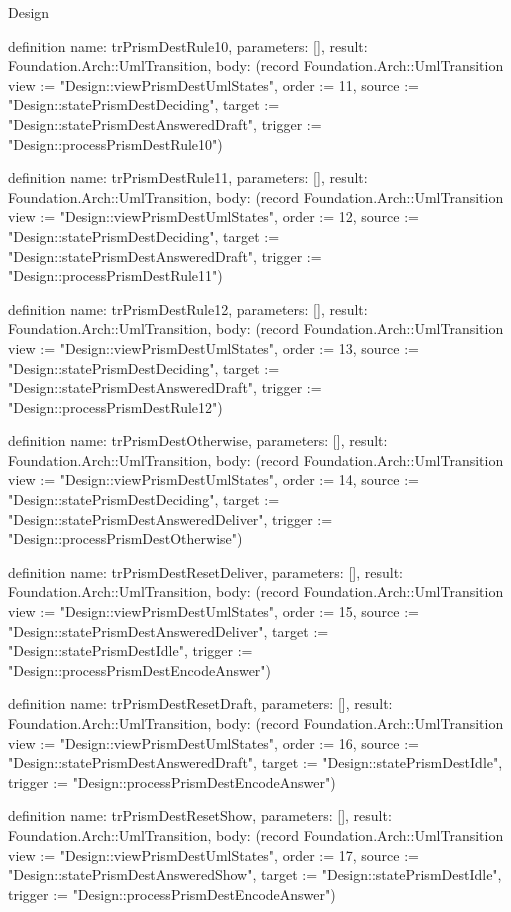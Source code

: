 \begin{lexlean}{Design}
\begin{semanticmodule}
definition{
  name: trPrismDestRule10,
  parameters: [],
  result: Foundation.Arch::UmlTransition,
  body: (record Foundation.Arch::UmlTransition {view := "Design::viewPrismDestUmlStates", order := 11, source := "Design::statePrismDestDeciding", target := "Design::statePrismDestAnsweredDraft", trigger := "Design::processPrismDestRule10"})
}

definition{
  name: trPrismDestRule11,
  parameters: [],
  result: Foundation.Arch::UmlTransition,
  body: (record Foundation.Arch::UmlTransition {view := "Design::viewPrismDestUmlStates", order := 12, source := "Design::statePrismDestDeciding", target := "Design::statePrismDestAnsweredDraft", trigger := "Design::processPrismDestRule11"})
}

definition{
  name: trPrismDestRule12,
  parameters: [],
  result: Foundation.Arch::UmlTransition,
  body: (record Foundation.Arch::UmlTransition {view := "Design::viewPrismDestUmlStates", order := 13, source := "Design::statePrismDestDeciding", target := "Design::statePrismDestAnsweredDraft", trigger := "Design::processPrismDestRule12"})
}

definition{
  name: trPrismDestOtherwise,
  parameters: [],
  result: Foundation.Arch::UmlTransition,
  body: (record Foundation.Arch::UmlTransition {view := "Design::viewPrismDestUmlStates", order := 14, source := "Design::statePrismDestDeciding", target := "Design::statePrismDestAnsweredDeliver", trigger := "Design::processPrismDestOtherwise"})
}

definition{
  name: trPrismDestResetDeliver,
  parameters: [],
  result: Foundation.Arch::UmlTransition,
  body: (record Foundation.Arch::UmlTransition {view := "Design::viewPrismDestUmlStates", order := 15, source := "Design::statePrismDestAnsweredDeliver", target := "Design::statePrismDestIdle", trigger := "Design::processPrismDestEncodeAnswer"})
}

definition{
  name: trPrismDestResetDraft,
  parameters: [],
  result: Foundation.Arch::UmlTransition,
  body: (record Foundation.Arch::UmlTransition {view := "Design::viewPrismDestUmlStates", order := 16, source := "Design::statePrismDestAnsweredDraft", target := "Design::statePrismDestIdle", trigger := "Design::processPrismDestEncodeAnswer"})
}

definition{
  name: trPrismDestResetShow,
  parameters: [],
  result: Foundation.Arch::UmlTransition,
  body: (record Foundation.Arch::UmlTransition {view := "Design::viewPrismDestUmlStates", order := 17, source := "Design::statePrismDestAnsweredShow", target := "Design::statePrismDestIdle", trigger := "Design::processPrismDestEncodeAnswer"})
}


\end{semanticmodule}
\end{lexlean}
